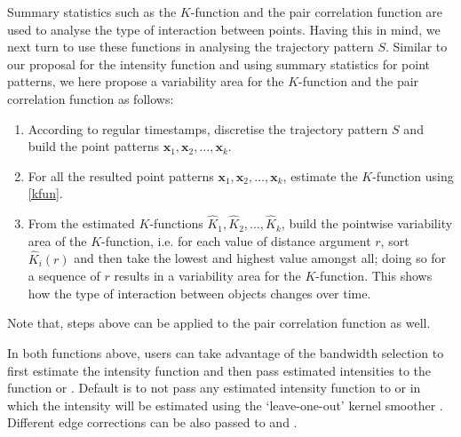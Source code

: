 \documentclass[article]{jss}
\begin{document}
Summary statistics such as the $K$-function and the pair correlation function are used to analyse the type of interaction between points. Having this in mind, we next turn to use these functions in analysing the trajectory pattern $S$. Similar to our proposal for the intensity function and using summary statistics for point patterns, we here propose a variability area for the $K$-function and the pair correlation function as follows:
  \begin{leftbar}
  \begin{enumerate}
  \item According to regular timestamps, discretise the trajectory pattern $S$ and build the point patterns $\mathbf{x}_1,\mathbf{x}_2, \ldots, \mathbf{x}_k$.
  \item For all the resulted point patterns $\mathbf{x}_1,\mathbf{x}_2, \ldots, \mathbf{x}_k$, estimate the $K$-function using \eqref{kfun}.
  \item From the estimated $K$-functions $\widehat{K}_1, \widehat{K}_2,\ldots,\widehat{K}_k$, build the pointwise variability area of the $K$-function, i.e. for each value of distance argument $r$, sort $\widehat{K}_i(r)$ and then take the lowest and highest value amongst all; doing so for a sequence of $r$ results in a variability area for the $K$-function. This shows how the type of interaction between objects changes over time.
  \end{enumerate}
  \end{leftbar}

Note that, steps above can be applied to the pair correlation function as well.

In both functions above, users can take advantage of the bandwidth selection to first estimate the intensity function and then pass estimated intensities to the function  or . Default is to not pass any estimated intensity function to  or  in which the intensity will be estimated using the `leave-one-out' kernel smoother \citep{baddeley00,BRT15}. Different edge corrections can be also passed to  and . 
  
\end{document}
